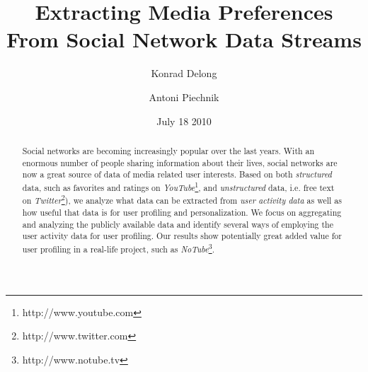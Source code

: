 \documentclass{article}
\begin{document}
\title{\textbf{Extracting Media Preferences From Social Network Data Streams}}
\author{Konrad Delong \and Antoni Piechnik}
\date{July 18 2010}

\maketitle

\begin{abstract} Social networks are becoming increasingly popular over the last
years. With an enormous number of people sharing information about their lives,
social networks are now a great source of data of media related user interests. Based on both
\textit{structured} data, such as favorites and ratings on \textit{YouTube}\footnote{http://www.youtube.com},
and \textit{unstructured} data, i.e. free text on \textit{Twitter}\footnote{http://www.twitter.com}),
we analyze what data can be extracted from \textit{user activity data} as well as how useful that data
is for user profiling and personalization. We focus on aggregating and analyzing the publicly available
data and identify several ways of employing the user activity data for user profiling.
Our results show potentially great added value for user profiling in a real-life project, such as \textit{NoTube}\footnote{http://www.notube.tv}.

\end{abstract}



















\end{document}
